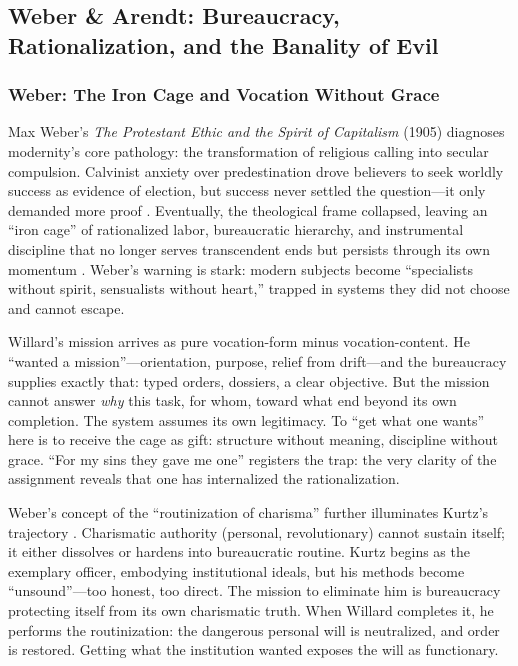 \subsection*{Weber \& Arendt: Bureaucracy, Rationalization, and the Banality of Evil}
\label{ssec:v-weber-arendt}

\subsubsection*{Weber: The Iron Cage and Vocation Without Grace}
Max Weber's \textit{The Protestant Ethic and the Spirit of Capitalism} (1905) diagnoses
modernity's core pathology: the transformation of religious calling into secular compulsion.
Calvinist anxiety over predestination drove believers to seek worldly success as evidence of
election, but success never settled the question---it only demanded more proof
\parencite{WeberProtestant2002}. Eventually, the theological frame collapsed, leaving an ``iron
cage'' of rationalized labor, bureaucratic hierarchy, and instrumental discipline that no
longer serves transcendent ends but persists through its own momentum
\parencite{WeberProtestant2002}. Weber's warning is stark: modern subjects become ``specialists
without spirit, sensualists without heart,'' trapped in systems they did not choose and cannot
escape.

Willard's mission arrives as pure vocation-form minus vocation-content. He ``wanted a
mission''---orientation, purpose, relief from drift---and the bureaucracy supplies exactly
that: typed orders, dossiers, a clear objective. But the mission cannot answer \emph{why} this
task, for whom, toward what end beyond its own completion. The system assumes its own
legitimacy. To ``get what one wants'' here is to receive the cage as gift: structure without
meaning, discipline without grace. ``For my sins they gave me one'' registers the trap: the
very clarity of the assignment reveals that one has internalized the rationalization.

Weber's concept of the ``routinization of charisma'' further illuminates Kurtz's trajectory
\parencite{WeberProtestant2002}. Charismatic authority (personal, revolutionary) cannot sustain
itself; it either dissolves or hardens into bureaucratic routine. Kurtz begins as the
exemplary officer, embodying institutional ideals, but his methods become ``unsound''---too
honest, too direct. The mission to eliminate him is bureaucracy protecting itself from its own
charismatic truth. When Willard completes it, he performs the routinization: the dangerous
personal will is neutralized, and order is restored. Getting what the institution wanted
exposes the will as functionary.

